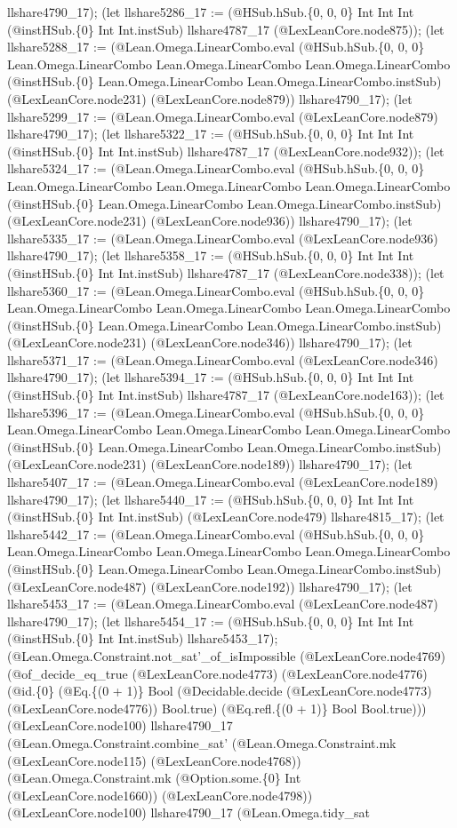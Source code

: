 \documentclass[11pt]{article}
\begin{document}
llshare4790\_17); (let llshare5286\_17 := (@HSub.hSub.\{0, 0, 0\} Int Int Int (@instHSub.\{0\} Int Int.instSub) llshare4787\_17 (@LexLeanCore.node875)); (let llshare5288\_17 := (@Lean.Omega.LinearCombo.eval (@HSub.hSub.\{0, 0, 0\} Lean.Omega.LinearCombo Lean.Omega.LinearCombo Lean.Omega.LinearCombo (@instHSub.\{0\} Lean.Omega.LinearCombo Lean.Omega.LinearCombo.instSub) (@LexLeanCore.node231) (@LexLeanCore.node879)) llshare4790\_17); (let llshare5299\_17 := (@Lean.Omega.LinearCombo.eval (@LexLeanCore.node879) llshare4790\_17); (let llshare5322\_17 := (@HSub.hSub.\{0, 0, 0\} Int Int Int (@instHSub.\{0\} Int Int.instSub) llshare4787\_17 (@LexLeanCore.node932)); (let llshare5324\_17 := (@Lean.Omega.LinearCombo.eval (@HSub.hSub.\{0, 0, 0\} Lean.Omega.LinearCombo Lean.Omega.LinearCombo Lean.Omega.LinearCombo (@instHSub.\{0\} Lean.Omega.LinearCombo Lean.Omega.LinearCombo.instSub) (@LexLeanCore.node231) (@LexLeanCore.node936)) llshare4790\_17); (let llshare5335\_17 := (@Lean.Omega.LinearCombo.eval (@LexLeanCore.node936) llshare4790\_17); (let llshare5358\_17 := (@HSub.hSub.\{0, 0, 0\} Int Int Int (@instHSub.\{0\} Int Int.instSub) llshare4787\_17 (@LexLeanCore.node338)); (let llshare5360\_17 := (@Lean.Omega.LinearCombo.eval (@HSub.hSub.\{0, 0, 0\} Lean.Omega.LinearCombo Lean.Omega.LinearCombo Lean.Omega.LinearCombo (@instHSub.\{0\} Lean.Omega.LinearCombo Lean.Omega.LinearCombo.instSub) (@LexLeanCore.node231) (@LexLeanCore.node346)) llshare4790\_17); (let llshare5371\_17 := (@Lean.Omega.LinearCombo.eval (@LexLeanCore.node346) llshare4790\_17); (let llshare5394\_17 := (@HSub.hSub.\{0, 0, 0\} Int Int Int (@instHSub.\{0\} Int Int.instSub) llshare4787\_17 (@LexLeanCore.node163)); (let llshare5396\_17 := (@Lean.Omega.LinearCombo.eval (@HSub.hSub.\{0, 0, 0\} Lean.Omega.LinearCombo Lean.Omega.LinearCombo Lean.Omega.LinearCombo (@instHSub.\{0\} Lean.Omega.LinearCombo Lean.Omega.LinearCombo.instSub) (@LexLeanCore.node231) (@LexLeanCore.node189)) llshare4790\_17); (let llshare5407\_17 := (@Lean.Omega.LinearCombo.eval (@LexLeanCore.node189) llshare4790\_17); (let llshare5440\_17 := (@HSub.hSub.\{0, 0, 0\} Int Int Int (@instHSub.\{0\} Int Int.instSub) (@LexLeanCore.node479) llshare4815\_17); (let llshare5442\_17 := (@Lean.Omega.LinearCombo.eval (@HSub.hSub.\{0, 0, 0\} Lean.Omega.LinearCombo Lean.Omega.LinearCombo Lean.Omega.LinearCombo (@instHSub.\{0\} Lean.Omega.LinearCombo Lean.Omega.LinearCombo.instSub) (@LexLeanCore.node487) (@LexLeanCore.node192)) llshare4790\_17); (let llshare5453\_17 := (@Lean.Omega.LinearCombo.eval (@LexLeanCore.node487) llshare4790\_17); (let llshare5454\_17 := (@HSub.hSub.\{0, 0, 0\} Int Int Int (@instHSub.\{0\} Int Int.instSub) llshare5453\_17); (@Lean.Omega.Constraint.not\_sat'\_of\_isImpossible (@LexLeanCore.node4769) (@of\_decide\_eq\_true (@LexLeanCore.node4773) (@LexLeanCore.node4776) (@id.\{0\} (@Eq.\{(0 + 1)\} Bool (@Decidable.decide (@LexLeanCore.node4773) (@LexLeanCore.node4776)) Bool.true) (@Eq.refl.\{(0 + 1)\} Bool Bool.true))) (@LexLeanCore.node100) llshare4790\_17 (@Lean.Omega.Constraint.combine\_sat' (@Lean.Omega.Constraint.mk (@LexLeanCore.node115) (@LexLeanCore.node4768)) (@Lean.Omega.Constraint.mk (@Option.some.\{0\} Int (@LexLeanCore.node1660)) (@LexLeanCore.node4798)) (@LexLeanCore.node100) llshare4790\_17 (@Lean.Omega.tidy\_sat 
\end{document}
